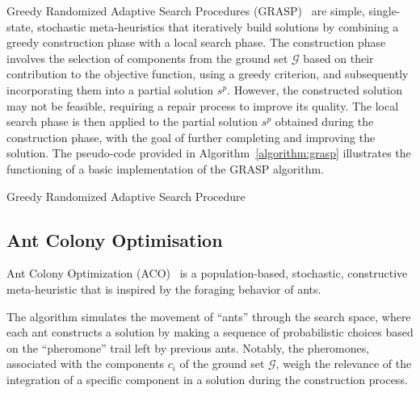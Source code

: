 Greedy Randomized Adaptive Search Procedures
(GRASP)~\cite{resende2010greedya,outeiro2021application,blummetaheuristics} are
simple, single-state, stochastic meta-heuristics that iteratively build solutions by
combining a greedy construction phase with a local search phase. The
construction phase involves the selection of components from the ground set
$\mathcal{G}$ based on their contribution to the objective function, using a
greedy criterion, and subsequently incorporating them into a partial solution
$s^{p}$. However, the constructed solution may not be feasible, requiring a
repair process to improve its quality. The local search phase is then applied to
the partial solution $s^{p}$ obtained during the construction phase, with the
goal of further completing and improving the solution. The pseudo-code provided
in Algorithm~\ref{algorithm:grasp} illustrates the functioning of a basic
implementation of the GRASP algorithm.

\begin{algorithm}[htb!]
  \DontPrintSemicolon
  \caption{Greedy Randomized Adaptive Search Procedure}
  \label{algorithm:grasp}
\end{algorithm}


\subsection{Ant Colony Optimisation}

Ant Colony Optimization (ACO)~\cite{dorigo2010anta,outeiro2021application,
  luke2013essentialsa,blummetaheuristics} is a population-based, stochastic,
constructive meta-heuristic that is inspired by the foraging behavior of ants.

The algorithm simulates the movement of ``ants'' through the search space, where
each ant constructs a solution by making a sequence of probabilistic choices
based on the ``pheromone'' trail left by previous ants. Notably, the pheromones,
associated with the components $c_{i}$ of the ground set $\mathcal{G}$, weigh
the relevance of the integration of a specific component in a solution during
the construction process.

